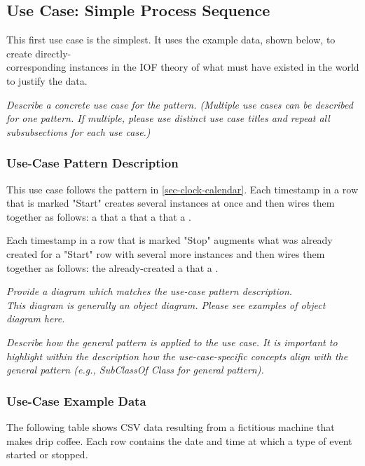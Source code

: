 \subsection*{Use Case: Simple Process Sequence}
This first use case is the simplest. It uses the example data, shown below, to create directly-\\corresponding instances in the IOF theory of what must have existed in the world to justify the data.

 \textit{ 
Describe a concrete use case for the pattern. (Multiple use cases can be described for one pattern. If multiple, please use distinct use case titles and repeat all subsubsections for each use case.)
  }

\newcommand{\ti}{\cname{bfo}{TemporalInstant }}

\subsubsection*{Use-Case Pattern Description}
This use case follows the pattern in \ref{sec-clock-calendar}.
Each timestamp in a row that is marked "Start" creates several instances at once and then wires them together as follows:
a  that  a \ti that  a  that  a .

Each timestamp in a row that is marked "Stop" augments what was already created for a "Start" row with several more instances and then wires them together as follows:
the already-created   a  that  a .

 \textit{ 
Provide a diagram which matches the use-case pattern description. \\
\noindent \textit{This diagram is generally an object diagram. Please see examples of object diagram here.}
  }

 \textit{ 
Describe how the general pattern is applied to the use case. It is important to highlight within the description how the use-case-specific concepts align with the general pattern (e.g., SubClassOf Class for general pattern).
  }

\subsubsection*{Use-Case Example Data}
The following table shows CSV data resulting from a fictitious machine that makes drip coffee. Each row contains the date and time at which a type of event started or stopped.
    
